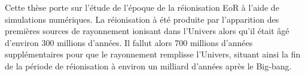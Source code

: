 %
%
Cette thèse porte sur l'étude de l'époque de la réionisation \ac{EoR} à l'aide de simulations numériques.
La réionisation à été produite par l'apparition des premières sources de rayonnement ionisant dans l'Univers alors qu'il était âgé d'environ 300 millions d'années. 
Il fallut alors 700 millions d'années supplémentaires pour que le rayonnement remplisse l'Univers, situant ainsi la fin de la période de réionisation à environ un milliard d'années après le Big-bang.



